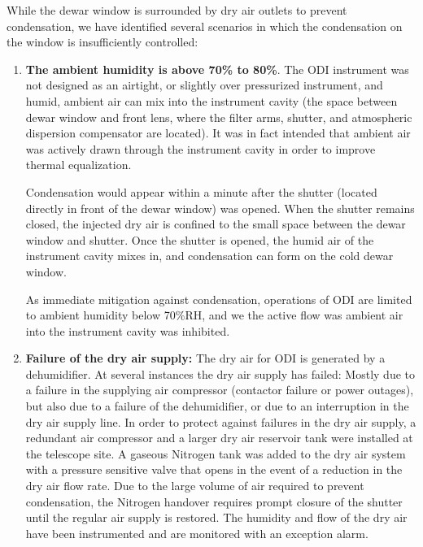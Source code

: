 \documentclass[]{spieman}
\begin{document}
While the dewar window is surrounded by dry air outlets to prevent condensation,
we have identified several scenarios in which the condensation  on the window is 
insufficiently controlled:

\begin{enumerate}

\item {\bf The ambient humidity is above 70\% to 80\%}. The ODI instrument was
not designed as an airtight, or slightly over pressurized instrument, and humid,
ambient air can mix into the instrument cavity (the space between dewar window
and front lens, where the filter arms, shutter, and atmospheric dispersion
compensator are located). It was in fact intended that ambient air was actively drawn
through	the instrument cavity in order to improve thermal equalization.

Condensation would  appear within a minute after the shutter (located directly
in front of the dewar window) was opened. When the shutter remains closed, the
injected dry air is confined to the small space between the dewar window and
shutter. Once the shutter is opened, the  humid air of the instrument cavity
mixes in, and condensation can form on the cold dewar window.

As immediate mitigation against condensation, operations of ODI are limited to
ambient humidity below 70\%RH, and we the active flow was ambient air into the
instrument cavity was inhibited.

\item {\bf Failure of the dry air supply:} The dry air for ODI is generated by a
dehumidifier. At several instances the dry air supply has failed: Mostly due to
a failure in the supplying air compressor (contactor failure or power outages),
but also due to a failure of the dehumidifier, or due to an interruption in the
dry air supply line. In order to protect against failures in the dry air supply,
a redundant air compressor and a larger dry air reservoir tank were installed at
the telescope site. A gaseous Nitrogen tank was added to the dry air system with 
a pressure sensitive valve that opens in the event of a reduction in the dry air
flow rate. Due to the large volume of air required to prevent condensation, 
the Nitrogen handover requires prompt closure of the shutter until the regular 
air supply is restored. The humidity and flow of the dry air have been instrumented
and are monitored with an exception alarm.


\end{enumerate}
\end{document}
